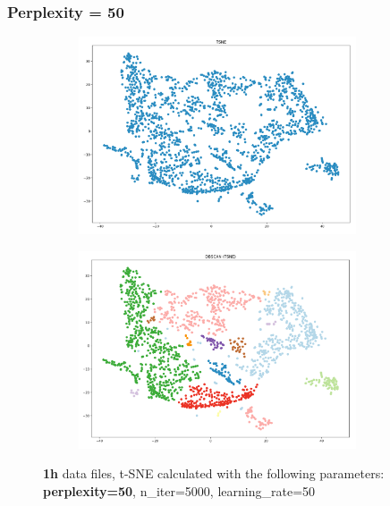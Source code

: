 \subsubsection{Perplexity = 50}
\begin{figure}[H]
  \centering
  \begin{subfigure}{.5\textwidth}
    \centering
    \includegraphics[width=0.9\textwidth]{./images/tsneParametersTest/perplexity/perp50-1hTSNE.png}
  \end{subfigure}%
  \begin{subfigure}{.5\textwidth}
    \centering
    \includegraphics[width=0.9\textwidth]{./images/tsneParametersTest/perplexity/perp50-1hDBSCAN.png}
  \end{subfigure}
	\caption{\textbf{1h} data files, t-SNE calculated with the following parameters: \textbf{perplexity=50}, n\_iter=5000, learning\_rate=50}
  \label{figure:1hperp50TSNE}
\end{figure}


